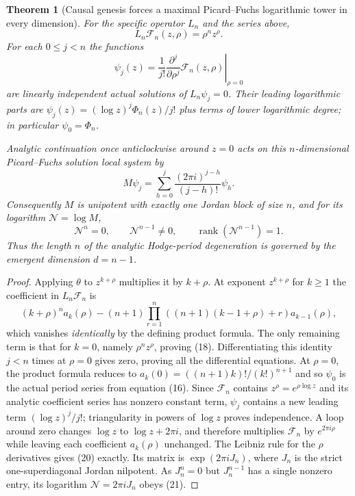 \documentclass[11pt]{article}
\newtheorem{theorem}{Theorem}
\begin{document}
\begin{theorem}[Causal genesis forces a maximal Picard--Fuchs
logarithmic tower in every dimension]
For the specific operator $L_n$ and the series above,
\[
 \boxed{\quad L_n\mathcal F_n(z,\rho)=\rho^n z^\rho.\quad}
 \tag{18}
\]
For each $0\le j<n$ the functions
\[
 \boxed{\quad
 \psi_j(z)=\frac1{j!}
  \left.\frac{\partial^j}{\partial\rho^j}
  \mathcal F_n(z,\rho)\right|_{\rho=0}
 \quad}\tag{19}
\]
are \emph{linearly independent actual solutions} of
$L_n\psi_j=0$. Their leading logarithmic parts are
$\psi_j(z)=(\log z)^j\Phi_n(z)/j!$ plus terms of lower
logarithmic degree; in particular $\psi_0=\Phi_n$.

Analytic continuation once anticlockwise around $z=0$
acts on this $n$-dimensional Picard--Fuchs solution local
system by
\[
\boxed{\quad
 M\psi_j=\sum_{h=0}^{j}
 \frac{(2\pi i)^{j-h}}{(j-h)!}\psi_h.
\quad}\tag{20}
\]
Consequently $M$ is unipotent with exactly one Jordan block
of size $n$, and for its logarithm
$\mathcal N=\log M$,
\[
\boxed{\quad
 \mathcal N^n=0,\qquad
 \mathcal N^{n-1}\ne0,\qquad
 \operatorname{rank}(\mathcal N^{n-1})=1.
\quad}\tag{21}
\]
Thus the length $n$ of the analytic Hodge-period degeneration
is governed by the \emph{emergent dimension} $d=n-1$.
\end{theorem}
\begin{proof}
Applying $\theta$ to $z^{k+\rho}$ multiplies it by
$k+\rho$. At exponent $z^{k+\rho}$ for $k\ge1$ the
coefficient in $L_n\mathcal F_n$ is
\[
(k+\rho)^n a_k(\rho)-
(n+1)\prod_{r=1}^{n}((n+1)(k-1+\rho)+r)
a_{k-1}(\rho),
\]
which vanishes \emph{identically} by the defining product
formula. The only remaining term is that for $k=0$,
namely $\rho^n z^\rho$, proving (18).
Differentiating this identity $j<n$ times at $\rho=0$
gives zero, proving all the differential equations.
At $\rho=0$, the product formula reduces to
$a_k(0)=((n+1)k)!/(k!)^{n+1}$ and so $\psi_0$
is the actual period series from equation (16).
Since $\mathcal F_n$ contains $z^\rho=e^{\rho\log z}$
and its analytic coefficient series has nonzero
constant term, $\psi_j$ contains a new leading
term $(\log z)^j/j!$; triangularity in powers
of $\log z$ proves independence.
A loop around zero changes $\log z$ to
$\log z+2\pi i$, and therefore multiplies
$\mathcal F_n$ by $e^{2\pi i\rho}$ while leaving
each coefficient $a_k(\rho)$ unchanged.
The Leibniz rule for the $\rho$ derivatives
gives (20) exactly. Its matrix is
$\exp(2\pi i J_n)$, where $J_n$ is the
strict one-superdiagonal Jordan nilpotent.
As $J_n^n=0$ but
$J_n^{n-1}$ has a single nonzero entry,
its logarithm
$\mathcal N=2\pi i J_n$ obeys (21).
\end{proof}
\end{document}
